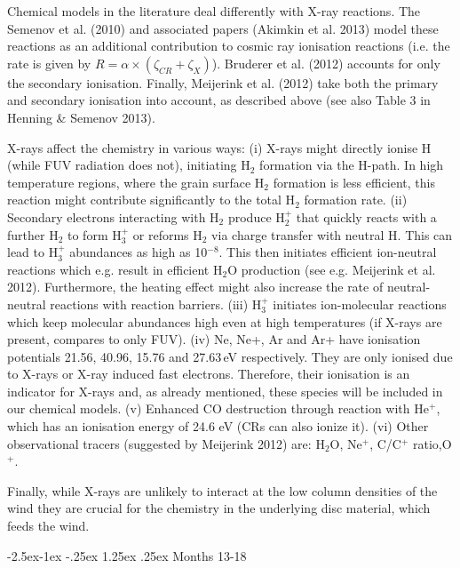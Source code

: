 \documentclass[10pt,fleqn,twoside]{article}
\makeatletter
\renewcommand\paragraph{\@startsection{paragraph}{4}{\z@}%
            {-2.5ex\@plus -1ex \@minus -.25ex}%
            {1.25ex \@plus .25ex}%
            {\normalfont\normalsize\bfseries}}
\makeatother
\begin{document}
Chemical models in the literature deal differently with X-ray reactions. The Semenov et al. (2010) and associated papers (Akimkin et al. 2013) model these reactions as an additional contribution to cosmic ray ionisation reactions (i.e. the rate is given by $R = \alpha \times (\zeta_{CR} + \zeta_X)$). Bruderer et al. (2012) accounts for only the secondary ionisation. Finally, Meijerink et al. (2012) take both the primary and secondary ionisation into account, as described above (see also Table 3 in Henning \& Semenov 2013).

X-rays affect the chemistry in various ways: (i) X-rays might directly ionise H (while FUV radiation does not), initiating H$_2$ formation via the H-path. In high temperature regions, where the grain surface H$_2$ formation is less efficient, this reaction might contribute significantly to the total H$_2$ formation rate. (ii) Secondary electrons interacting with H$_2$ produce H$_2^+$ that quickly reacts with a further H$_2$ to form H$_3^+$ or reforms H$_2$ via charge transfer with neutral H. This can lead to H$_3^+$ abundances as high as 10$^{-8}$. This then initiates efficient ion-neutral reactions which e.g. result in efficient H$_2$O production (see e.g. Meijerink et al. 2012). Furthermore, the heating effect might also increase the rate of neutral-neutral reactions with reaction barriers. (iii) H$_3^+$ initiates ion-molecular reactions which keep molecular abundances high even at high temperatures (if X-rays are present, compares to only FUV). (iv)
Ne, Ne+, Ar and Ar+ have ionisation potentials 21.56, 40.96, 15.76 and 27.63\,eV respectively. They are only ionised due to X-rays or X-ray induced fast electrons. Therefore, their ionisation is an indicator for X-rays and, as already mentioned, these species will be included in our chemical models. (v) Enhanced CO destruction through reaction with He$^+$, which has an ionisation energy of 24.6 eV (CRs can also ionize it). (vi) Other observational tracers (suggested by Meijerink 2012) are: H$_2$O, Ne$^+$, C/C$^+$ ratio,O$^+$.

Finally, while X-rays are unlikely to interact at the low column densities of the wind they are crucial for the chemistry in the underlying disc material, which feeds the wind. 

\paragraph{ Months 13-18}
\end{document}
